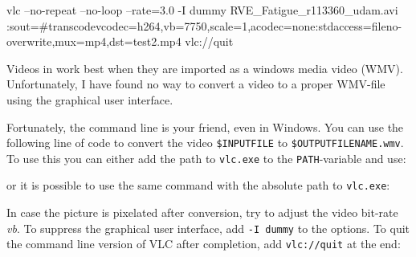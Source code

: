 \begingroup
\lstset{breaklines = true}
\begin{code}
vlc --no-repeat --no-loop --rate=3.0 -I dummy RVE_Fatigue_r113360_udam.avi :sout=#transcode{vcodec=h264,vb=7750,scale=1,acodec=none}:std{access=file{no-overwrite},mux=mp4,dst=test2.mp4} vlc://quit
\end{code}
\endgroup


Videos in \marktool{\powerpointname} work best when they are imported as a windows media video (WMV). Unfortunately, I have found no way to convert a video to a proper WMV-file using the \vlcname{} graphical user interface.

Fortunately, the command line is your friend, even in Windows. You can use the following line of code to convert the video \verb+$INPUTFILE+ to \verb+$OUTPUTFILENAME.wmv+. To use this you can either add the path to \verb+vlc.exe+ to the \verb+PATH+-variable and use:

\begingroup
\lstset{breaklines = true}
\endgroup

or it is possible to use the same command with the absolute path to \verb+vlc.exe+:

\begingroup
\lstset{breaklines = true}
\endgroup

In case the picture is pixelated after conversion, try to adjust the video bit-rate \textit{vb}. To suppress the graphical user interface, add \texttt{-I dummy} to the options. To quit the command line version of VLC after completion, add \texttt{vlc://quit} at the end:

\begingroup
\lstset{breaklines = true}
\endgroup

